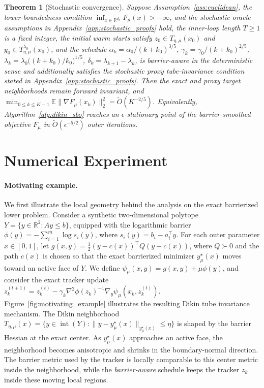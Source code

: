 \documentclass{article}
\newtheorem{theorem}{Theorem}
\begin{document}
\begin{theorem}[Stochastic convergence]
\label{thm:stoch_upper}
Suppose Assumption~\ref{ass:euclidean}, the lower-boundedness condition
\(\inf_{x\in\mathbb R^{d_x}}F_\mu(x)>-\infty\), and the stochastic oracle assumptions in
Appendix~\ref{app:stochastic_proofs} hold, the inner-loop length \(T\ge 1\) is a fixed integer,
the initial warm starts satisfy
\(z_0\in T_{\eta,\mu}(x_0)\) and \(y_0\in T_{\eta,\mu}^{\lambda_0}(x_0)\), and the schedule
\(\alpha_k=\alpha_0/(k+k_0)^{3/5}\), \(\gamma_k=\gamma_0/(k+k_0)^{2/5}\),
\(\lambda_k=\lambda_0\bigl((k+k_0)/k_0\bigr)^{1/5}\), \(\delta_k=\lambda_{k+1}-\lambda_k\),
is \textit{barrier-aware} in the deterministic sense and additionally satisfies the stochastic proxy tube-invariance condition stated in Appendix~\ref{app:stochastic_proofs}. Then the exact and proxy target neighborhoods remain forward invariant, and
\(\min_{0\le k\le K-1}\mathbb E\|\nabla F_\mu(x_k)\|_2^2=\widetilde O(K^{-2/5})\).
Equivalently, Algorithm~\ref{alg:dikin_sbo} reaches an \(\epsilon\)-stationary point of the
barrier-smoothed objective \(F_\mu\) in \(\widetilde O(\epsilon^{-5/2})\) outer iterations.
\end{theorem}



\section{Numerical Experiment}
\label{sec:experiments}
\paragraph{Motivating example.}
We first illustrate the local geometry behind the analysis on the exact barrierized lower problem.
Consider a synthetic two-dimensional polytope
\(Y=\{y\in\mathbb R^2:Ay\le b\}\), equipped with the logarithmic barrier
\(\phi(y)=-\sum_{i=1}^m\log s_i(y)\), where \(s_i(y)=b_i-a_i^\top y\). For each
outer parameter \(x\in[0,1]\), let
\(g(x,y)=\frac12(y-c(x))^\top Q(y-c(x))\), where \(Q\succ0\) and the path \(c(x)\) is chosen so
that the exact barrierized minimizer \(y_\mu^\star(x)\) moves toward an active face of \(Y\). We define \(\psi_\mu(x,y)=g(x,y)+\mu\phi(y)\), and consider the exact tracker update 
\(z_k^{(t+1)}
=
z_k^{(t)}
-
\gamma_k \nabla^2\phi(z_k)^{-1}\nabla_y\psi_\mu(x_k,z_k^{(t)}).\)
Figure~\ref{fig:motivating_example} illustrates the resulting Dikin tube invariance mechanism.
The Dikin neighborhood
\(T_{\eta,\mu}(x)=\{y\in\operatorname{int}(Y):\|y-y_\mu^\star(x)\|_{y_\mu^\star(x)}\le\eta\}\)
is shaped by the barrier Hessian at the exact center. As \(y_\mu^\star(x)\) approaches an active
face, the neighborhood becomes anisotropic and shrinks in the boundary-normal direction. The barrier
metric used by the tracker is locally comparable to this center metric inside the neighborhood, while the
\textit{barrier-aware} schedule keeps the tracker \(z_k\) inside these moving local regions.
\end{document}
